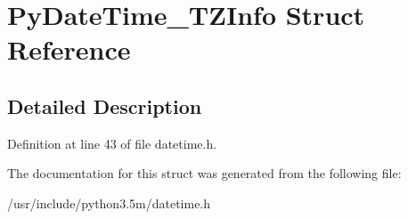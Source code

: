 \hypertarget{structPyDateTime__TZInfo}{}\section{Py\+Date\+Time\+\_\+\+T\+Z\+Info Struct Reference}
\label{structPyDateTime__TZInfo}


\subsection{Detailed Description}


Definition at line 43 of file datetime.\+h.



The documentation for this struct was generated from the following file\+:\begin{DoxyCompactItemize}
\item 
/usr/include/python3.\+5m/datetime.\+h\end{DoxyCompactItemize}
